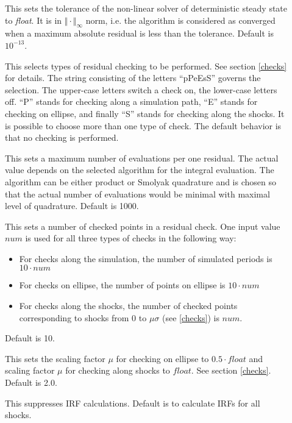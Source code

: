 \documentclass[10pt]{article}
\begin{document}
\begin{description}
\item[] This sets the tolerance of the
non-linear solver of deterministic steady state to {\it float}. It is
in $\Vert\cdot\Vert_\infty$ norm, i.e. the algorithm is considered as
converged when a maximum absolute residual is less than the
tolerance. Default is $10^{-13}$.

\item[] This selects types of residual
checking to be performed. See section \ref{checks} for details. The
string consisting of the letters ``pPeEsS'' governs the selection. The
upper-case letters switch a check on, the lower-case letters
off. ``P'' stands for checking along a simulation path, ``E'' stands
for checking on ellipse, and finally ``S'' stands for checking along
the shocks. It is possible to choose more than one type of check. The
default behavior is that no checking is performed.

\item[] This sets a maximum number of
evaluations per one re\-sidual. The actual value depends on the selected
algorithm for the integral evaluation. The algorithm can be either
product or Smolyak quadrature and is chosen so that the actual number
of evaluations would be minimal with maximal level of
quadrature. Default is 1000.

\item[] This sets a number of checked
points in a residual check. One input value $num$ is used for all
three types of checks in the following way:
\begin{itemize}
\item For checks along the simulation, the number of simulated periods
is $10\cdot num$
\item For checks on ellipse, the number of points on ellipse is $10\cdot num$
\item For checks along the shocks, the number of checked points
corresponding to shocks from $0$ to $\mu\sigma$ (see \ref{checks}) is
$num$.
\end{itemize}
Default is 10.

\item[] This sets the scaling factor
$\mu$ for checking on ellipse to $0.5\cdot float$ and scaling factor
$\mu$ for checking along shocks to $float$. See section
\ref{checks}. Default is 2.0.

\item[] This suppresses IRF calculations. Default
is to calculate IRFs for all shocks.


\end{description}
\end{document}

